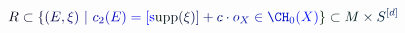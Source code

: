 \documentclass[12pt]{article}
\begin{document}
\makeatletter
\renewcommand*{\@textcolor}[3]{%
  \protect\leavevmode
  \begingroup
    \color#1{#2}#3%
  \endgroup
}
\makeatother
\begin{displaymath}
\mathcolor[RGB]{0,0,15}{R} \mathcolor[RGB]{0,0,30}{\subset} \mathcolor[RGB]{0,0,45}{\{} \mathcolor[RGB]{0,0,60}{(} \mathcolor[RGB]{0,0,75}{E} \mathcolor[RGB]{0,0,90}{,} \mathcolor[RGB]{0,0,105}{\xi} \mathcolor[RGB]{0,0,120}{)} ~ \mathcolor[RGB]{0,0,135}{|} ~ \mathcolor[RGB]{0,0,150}{c} _ { \mathcolor[RGB]{0,0,165}{2} } \mathcolor[RGB]{0,0,180}{(} \mathcolor[RGB]{0,0,195}{E} \mathcolor[RGB]{0,0,210}{)} \mathcolor[RGB]{0,0,225}{=} \mathcolor[RGB]{0,0,240}{[} \mathrm { \mathcolor[RGB]{0,0,255}{s} \mathcolor[RGB]{0,15,0}{u} \mathcolor[RGB]{0,15,15}{p} \mathcolor[RGB]{0,15,30}{p} } \mathcolor[RGB]{0,15,45}{(} \mathcolor[RGB]{0,15,60}{\xi} \mathcolor[RGB]{0,15,75}{)} \mathcolor[RGB]{0,15,90}{]} \mathcolor[RGB]{0,15,105}{+} \mathcolor[RGB]{0,15,120}{c} \mathcolor[RGB]{0,15,135}{\cdot} \mathcolor[RGB]{0,15,150}{o} _ { \mathcolor[RGB]{0,15,165}{X} } \mathcolor[RGB]{0,15,180}{\in} \mathcolor[RGB]{0,15,195}{\CH} _ { \mathcolor[RGB]{0,15,210}{0} } \mathcolor[RGB]{0,15,225}{(} \mathcolor[RGB]{0,15,240}{X} \mathcolor[RGB]{0,15,255}{)} \mathcolor[RGB]{0,30,0}{\}} \mathcolor[RGB]{0,30,15}{\subset} \mathcolor[RGB]{0,30,30}{M} \mathcolor[RGB]{0,30,45}{\times} \mathcolor[RGB]{0,30,60}{S} ^ { \mathcolor[RGB]{0,30,75}{[} \mathcolor[RGB]{0,30,90}{d} \mathcolor[RGB]{0,30,105}{]} }
\end{displaymath}
\end{document}
